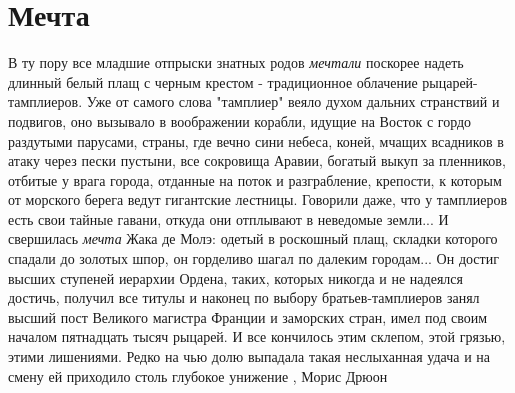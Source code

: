  
 
 
 
 
\chapter{Мечта}

В ту пору все младшие отпрыски знатных родов \emph{мечтали} поскорее надеть длинный
белый плащ с черным крестом - традиционное облачение
рыцарей-тамплиеров. Уже от самого слова "тамплиер" веяло духом дальних
странствий и подвигов, оно вызывало в воображении корабли, идущие на
Восток с гордо раздутыми парусами, страны, где вечно сини небеса, коней,
мчащих всадников в атаку через пески пустыни, все сокровища Аравии,
богатый выкуп за пленников, отбитые у врага города, отданные на поток и
разграбление, крепости, к которым от морского берега ведут гигантские
лестницы. Говорили даже, что у тамплиеров есть свои тайные гавани, откуда они
отплывают в неведомые земли... И свершилась \emph{мечта} Жака де Молэ: одетый в
роскошный плащ, складки которого спадали до золотых шпор, он горделиво шагал
по далеким городам... Он достиг высших ступеней иерархии Ордена, таких,
которых никогда и не надеялся достичь, получил все титулы и
наконец по выбору братьев-тамплиеров занял высший пост Великого магистра
Франции и заморских стран, имел под своим началом пятнадцать тысяч рыцарей. И
все кончилось этим склепом, этой грязью, этими лишениями. Редко на чью долю
выпадала такая неслыханная удача и на смену ей приходило столь глубокое
унижение
, Морис Дрюон
